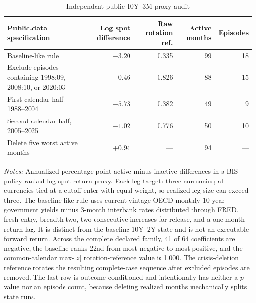 \begin{table}[H]
\centering
\caption{Independent public 10Y--3M proxy audit}
\label{tab:v03-public-proxy}
\small
\begin{tabularx}{\textwidth}{>{\raggedright\arraybackslash}Xrrrr}
\toprule
Public-data specification & Log spot difference & Raw rotation ref. & Active months & Episodes \\
\midrule
Baseline-like rule & $-3.20$ & 0.335 & 99 & 18 \\
Exclude episodes containing 1998:09, 2008:10, or 2020:03 & $-0.46$ & 0.826 & 88 & 15 \\
First calendar half, 1988--2004 & $-5.73$ & 0.382 & 49 & 9 \\
Second calendar half, 2005--2025 & $-1.02$ & 0.776 & 50 & 10 \\
Delete five worst active months & $+0.94$ & --- & 94 & --- \\
\bottomrule
\end{tabularx}

\begin{minipage}{0.94\textwidth}
\footnotesize\emph{Notes:} Annualized percentage-point active-minus-inactive differences in a BIS policy-ranked log spot-return proxy. Each leg targets three currencies; all currencies tied at a cutoff enter with equal weight, so realized leg size can exceed three. The baseline-like rule uses current-vintage OECD monthly 10-year government yields minus 3-month interbank rates distributed through FRED, fresh entry, breadth two, two consecutive increases for release, and a one-month return lag. It is distinct from the baseline 10Y--2Y state and is not an executable forward return. Across the complete declared family, 41 of 64 coefficients are negative, the baseline ranks 22nd from most negative to most positive, and the common-calendar max-$|z|$ rotation-reference value is 1.000. The crisis-deletion reference rotates the resulting complete-case sequence after excluded episodes are removed. The last row is outcome-conditioned and intentionally has neither a $p$-value nor an episode count, because deleting realized months mechanically splits state runs.
\end{minipage}
\end{table}
